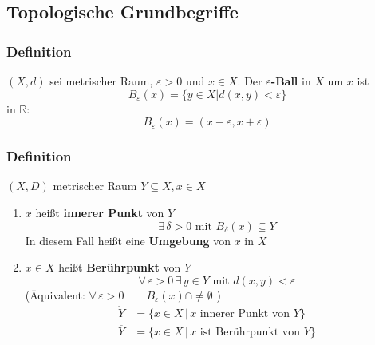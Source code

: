\subsection{Topologische Grundbegriffe} %
\label{sub:topologische_grundbegriffe}
\subsubsection[$\varepsilon$-Ball]{Definition} %
\label{ssub:definition}
 $(X,d)$ sei metrischer Raum, $\varepsilon >0$ und $x \in X$. Der {\bfseries $\varepsilon $-Ball} in $X$ um $x$ ist
 \[
 	B_{\varepsilon }(x) = \{ y \in X | d(x,y)< \varepsilon \}
 \]
 in $\mathbb{R}$: \[
 	B_{\varepsilon}(x)=(x-\varepsilon ,x+ \varepsilon)
 \]
\subsubsection[Innerer Punkt, Umgebung]{Definition} %
\label{ssub:definition}
$(X,D)$ metrischer Raum $Y \subseteq X, x \in X$
\begin{enumerate}
	\item $x$ heißt {\bfseries innerer Punkt} von $Y$  \[
		\exists\, \delta>0 \text{ mit } B_{\delta }(x) \subseteq Y
	\]
	In diesem Fall heißt eine {\bfseries Umgebung} von $x$ in $X$
	\item $x \in X$ heißt {\bfseries Berührpunkt} von $Y$
	\[
		\forall\, \varepsilon >0 \, \exists\, y \in Y \text{ mit } d(x,y)<\varepsilon 
	\]
	(Äquivalent: $\forall\, \varepsilon > 0 \qquad B_{\varepsilon }(x)\cap \neq \emptyset$ )
	\begin{align*}
		\mathring{Y}&= \{ x \in X \,|\, x \text{ innerer Punkt von } Y \} \\
		\overline{Y} &= \{ x \in X \,|\, x \text{ ist Berührpunkt von } Y \} 
	\end{align*}
\end{enumerate}
